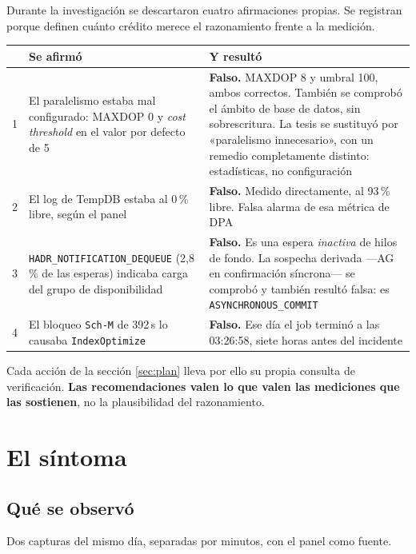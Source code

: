 \documentclass[11pt,a4paper]{article}
\newcommand{\cod}[1]{\texttt{\small #1}}
\newcommand{\critico}[1]{\textcolor{rojo}{\textbf{#1}}}
\begin{document}
Durante la investigación se descartaron cuatro afirmaciones propias. Se
registran porque definen cuánto crédito merece el razonamiento frente a la
medición.

\begin{longtable}{p{0.4cm}p{6.4cm}p{8.8cm}}
\toprule
& \textbf{Se afirmó} & \textbf{Y resultó} \\
\midrule
\endhead
1 & El paralelismo estaba mal configurado: MAXDOP 0 y \emph{cost threshold}
    en el valor por defecto de 5
  & \critico{Falso.} MAXDOP 8 y umbral 100, ambos correctos. También se
    comprobó el ámbito de base de datos, sin sobrescritura. La tesis se
    sustituyó por «paralelismo innecesario», con un remedio completamente
    distinto: estadísticas, no configuración \\
2 & El log de TempDB estaba al 0\,\% libre, según el panel
  & \critico{Falso.} Medido directamente, al 93\,\% libre. Falsa alarma de esa
    métrica de DPA \\
3 & \cod{HADR\_NOTIFICATION\_DEQUEUE} (2,8\,\% de las esperas) indicaba carga
    del grupo de disponibilidad
  & \critico{Falso.} Es una espera \emph{inactiva} de hilos de fondo. La
    sospecha derivada —AG en confirmación síncrona— se comprobó y también
    resultó falsa: es \cod{ASYNCHRONOUS\_COMMIT} \\
4 & El bloqueo \cod{Sch-M} de 392\,s lo causaba \cod{IndexOptimize}
  & \critico{Falso.} Ese día el job terminó a las 03:26:58, siete horas antes
    del incidente \\
\bottomrule
\end{longtable}

\noindent Cada acción de la sección \ref{sec:plan} lleva por ello su propia
consulta de verificación. \textbf{Las recomendaciones valen lo que valen las
mediciones que las sostienen}, no la plausibilidad del razonamiento.

\newpage
\section{El síntoma}

\subsection{Qué se observó}

Dos capturas del mismo día, separadas por minutos, con el panel como fuente.
\end{document}
